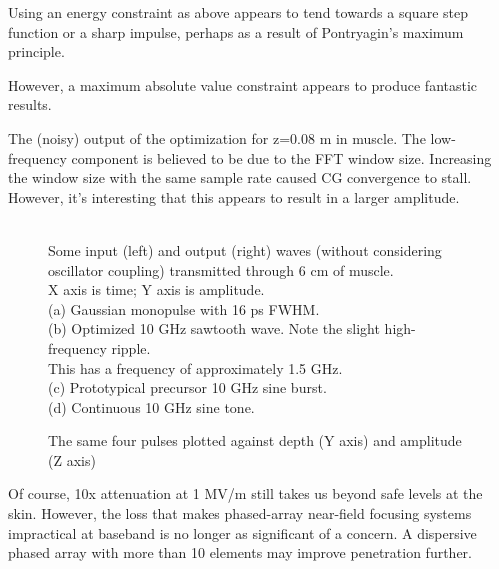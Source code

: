 \documentclass[paper.tex]{subfiles}
\begin{document}
Using an energy constraint as above appears to tend towards a square step function or a sharp impulse, perhaps as a result of Pontryagin's maximum principle\cite{Optimum1964}.


However, a maximum absolute value constraint appears to produce fantastic results.


\begin{figure}[H]
	
	\caption{}
\end{figure}


The (noisy) output of the optimization for z=0.08 m in muscle. The low-frequency component is believed to be due to the FFT window size. Increasing the window size with the same sample rate caused CG convergence to stall. However, it's interesting that this appears to result in a larger amplitude. 


%	


\begin{figure}[H]
	
	\caption{\\
		Some input (left) and output (right) waves (without considering oscillator coupling) transmitted through 6 cm of muscle.\\
		X axis is time; Y axis is amplitude.\\
		(a) Gaussian monopulse with 16 ps FWHM.\\
		(b) Optimized 10 GHz sawtooth wave. Note the slight high-frequency ripple.\\ This has a frequency of approximately 1.5 GHz.\\
		(c) Prototypical precursor 10 GHz sine burst.\\
		(d) Continuous 10 GHz sine tone.
}
\end{figure}

\begin{figure}[H]
	
	\caption{The same four pulses plotted against depth (Y axis) and amplitude (Z axis)}
\end{figure}

Of course, 10x attenuation at 1 MV/m still takes us beyond safe levels at the skin. However, the loss that makes phased-array near-field focusing systems impractical at baseband is no longer as significant of a concern. A dispersive phased array with more than 10 elements may improve penetration further.
\end{document}
